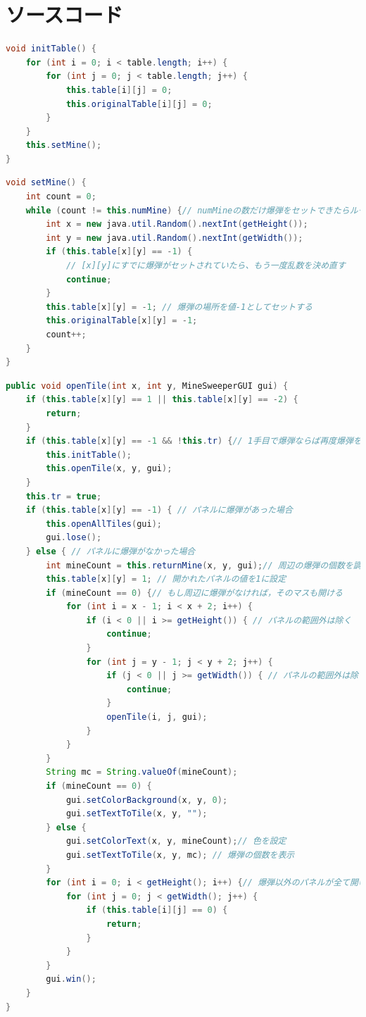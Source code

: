 \documentclass[a4j,11pt]{jsarticle}
\begin{document}
\part{ソースコード}\label{sec:ソースコード}
\noindent{}
\lstset{frame=shadowbox,numbers=left}
\begin{lstlisting}[caption=\ttfamily initTable, label=src:initTable, language=Java]
void initTable() {
    for (int i = 0; i < table.length; i++) {
        for (int j = 0; j < table.length; j++) {
            this.table[i][j] = 0;
            this.originalTable[i][j] = 0;
        }
    }
    this.setMine();
}    
\end{lstlisting}
\begin{lstlisting}[caption=\ttfamily setMine, label=src:setMine, language=Java]
void setMine() {
    int count = 0;
    while (count != this.numMine) {// numMineの数だけ爆弾をセットできたらループを抜ける
        int x = new java.util.Random().nextInt(getHeight());
        int y = new java.util.Random().nextInt(getWidth());
        if (this.table[x][y] == -1) {
            // [x][y]にすでに爆弾がセットされていたら、もう一度乱数を決め直す
            continue;
        }
        this.table[x][y] = -1; // 爆弾の場所を値-1としてセットする
        this.originalTable[x][y] = -1;
        count++;
    }
}
\end{lstlisting}
\begin{lstlisting}[caption=\ttfamily openTile, label=src:openTile, language=Java]
public void openTile(int x, int y, MineSweeperGUI gui) {
	if (this.table[x][y] == 1 || this.table[x][y] == -2) {
		return;
	}
	if (this.table[x][y] == -1 && !this.tr) {// 1手目で爆弾ならば再度爆弾をセット
		this.initTable();
		this.openTile(x, y, gui);
	}
	this.tr = true;
	if (this.table[x][y] == -1) { // パネルに爆弾があった場合
		this.openAllTiles(gui);
		gui.lose();
	} else { // パネルに爆弾がなかった場合
		int mineCount = this.returnMine(x, y, gui);// 周辺の爆弾の個数を調査
		this.table[x][y] = 1; // 開かれたパネルの値を1に設定
		if (mineCount == 0) {// もし周辺に爆弾がなければ，そのマスも開ける
			for (int i = x - 1; i < x + 2; i++) {
				if (i < 0 || i >= getHeight()) { // パネルの範囲外は除く
					continue;
				}
				for (int j = y - 1; j < y + 2; j++) {
					if (j < 0 || j >= getWidth()) { // パネルの範囲外は除く
						continue;
					}
					openTile(i, j, gui);
				}
			}
		}
		String mc = String.valueOf(mineCount);
		if (mineCount == 0) {
			gui.setColorBackground(x, y, 0);
			gui.setTextToTile(x, y, "");
		} else {
			gui.setColorText(x, y, mineCount);// 色を設定
			gui.setTextToTile(x, y, mc); // 爆弾の個数を表示
		}
		for (int i = 0; i < getHeight(); i++) {// 爆弾以外のパネルが全て開いているか確認
			for (int j = 0; j < getWidth(); j++) {
				if (this.table[i][j] == 0) {
					return;
				}
			}
		}
		gui.win();
	}
}
\end{lstlisting}
\end{document}
